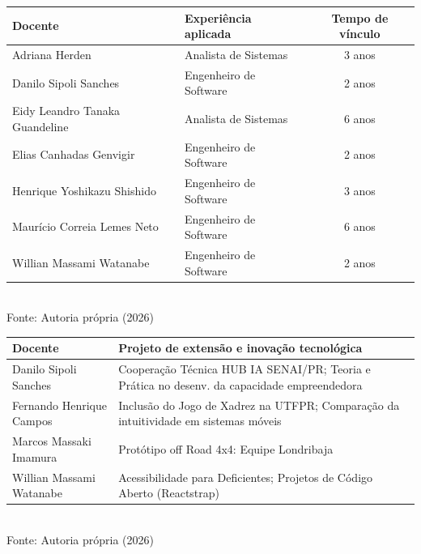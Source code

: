 \begin{quadro}[ht]
\caption{Atuação profissional na área aplicada do curso por docente}
\label{quadro3.4}
\centering
\begin{tabular}{|p{5cm}|p{4cm}|c|}
\hline
\textbf{Docente} & \textbf{Experiência aplicada} & \textbf{Tempo de vínculo} \\ \hline
Adriana Herden & Analista de Sistemas & 3 anos \\ \hline
Danilo Sipoli Sanches & Engenheiro de Software & 2 anos \\ \hline
Eidy Leandro Tanaka Guandeline & Analista de Sistemas & 6 anos \\ \hline
Elias Canhadas Genvigir & Engenheiro de Software & 2 anos \\ \hline
Henrique Yoshikazu Shishido & Engenheiro de Software & 3 anos \\ \hline
Maurício Correia Lemes Neto & Engenheiro de Software & 6 anos \\ \hline
Willian Massami Watanabe & Engenheiro de Software & 2 anos \\ \hline
\end{tabular}
\small \\ Fonte: Autoria própria (2026)
\end{quadro}

\begin{quadro}[ht]
\caption{Projetos de extensão e inovação tecnológica dos docentes}
\label{quadro3.5}
\centering
\begin{tabular}{|p{4cm}|p{10cm}|}
\hline
\textbf{Docente} & \textbf{Projeto de extensão e inovação tecnológica} \\ \hline
Danilo Sipoli Sanches & Cooperação Técnica HUB IA SENAI/PR; Teoria e Prática no desenv. da capacidade empreendedora \\ \hline
Fernando Henrique Campos & Inclusão do Jogo de Xadrez na UTFPR; Comparação da intuitividade em sistemas móveis \\ \hline
Marcos Massaki Imamura & Protótipo off Road 4x4: Equipe Londribaja \\ \hline
Willian Massami Watanabe & Acessibilidade para Deficientes; Projetos de Código Aberto (Reactstrap) \\ \hline
\end{tabular}
\small \\ Fonte: Autoria própria (2026)
\end{quadro}

